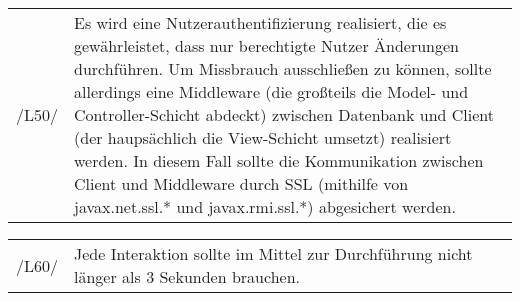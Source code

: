 \begin{tabular}{p{1.5cm}p{14.5cm}}
					
	 /L50/	& Es wird eine Nutzerauthentifizierung realisiert, die es gewährleistet, dass nur berechtigte Nutzer Änderungen durchführen. Um Missbrauch ausschließen zu können, sollte allerdings eine Middleware (die großteils die Model- und Controller-Schicht abdeckt) zwischen Datenbank und Client (der haupsächlich die View-Schicht umsetzt) realisiert werden. In diesem Fall sollte die Kommunikation zwischen Client und Middleware durch SSL (mithilfe von javax.net.ssl.* und javax.rmi.ssl.*) abgesichert werden. \\[0.25cm]
	
\end{tabular}


\begin{tabular}{p{1.5cm}p{14.5cm}}
					
	 /L60/	& Jede Interaktion sollte im Mittel zur Durchführung nicht länger als 3 Sekunden brauchen. \\[0.25cm]
	
\end{tabular}



% 
